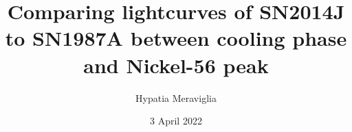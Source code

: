 
\author{Hypatia Meraviglia}
\title{Comparing lightcurves of SN2014J to SN1987A between cooling phase and Nickel-56 peak}
\date{3 April 2022}



\maketitle

\newline

